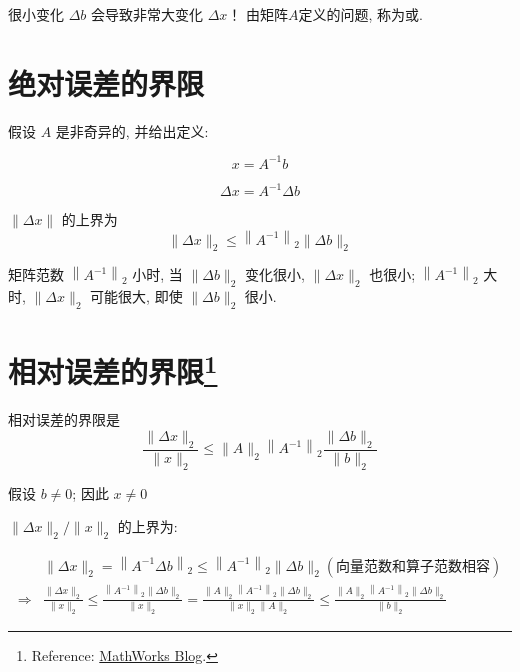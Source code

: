 很小变化 $ \Delta b $ 会导致非常大变化 $ \Delta x $！ 由矩阵$A$定义的问题, 称为或. 



\section{绝对误差的界限}

假设 $ A $ 是非奇异的, 并给出定义:

\begin{notation}
    $$ x=A^{-1} b$$ 
    
    $$ \Delta x=A^{-1} \Delta b $$
\end{notation}

\begin{theorem}[绝对误差的界限]
    $ \|\Delta x\| $ 的上界为
    $$
    \|\Delta x\|_{2} \leq\left\|A^{-1}\right\|_{2}\|\Delta b\|_{2}
    $$

\end{theorem}

矩阵范数 $ \left\|A^{-1}\right\|_{2} $ 小时, 当 $ \|\Delta b\|_{2} $ 变化很小, $ \|\Delta x\|_{2} $ 也很小; $ \left\|A^{-1}\right\|_{2} $ 大时,  $ \|\Delta x\|_{2} $ 可能很大,  即使 $ \|\Delta b\|_{2} $ 很小. 

\section[相对误差的界限]{相对误差的界限\footnote{Reference: \href{https://blogs.mathworks.com/cleve/2017/07/17/what-is-the-condition-number-of-a-matrix/?from=cn}{MathWorks Blog}.}}

\begin{theorem}[相对误差的界限]
    相对误差的界限是
    $$ \frac{\|\Delta x\|_{2}}{\|x\|_{2}} \leq\|A\|_{2}\left\|A^{-1}\right\|_{2} \frac{\|\Delta b\|_{2}}{\|b\|_{2}} $$
\end{theorem}

假设 $ b \neq 0 $; 因此 $ x \neq 0$

$\|\Delta x\|_{2} /\|x\|_{2} $ 的上界为:

$$ 
\begin{aligned}
    &\|\Delta x\|_{2}=\left\|A^{-1} \Delta b\right\|_{2} \leq\left\|A^{-1}\right\|_{2}\|\Delta b\|_{2}(向量范数和算子范数相容)\\
    \Rightarrow& \frac{\|\Delta x\|_{2}}{\|x\|_{2}} \leq \frac{\left\|A^{-1}\right\|_{2}\|\Delta b\|_{2}}{\|x\|_{2}}=\frac{\|A\|_{2}\left\|A^{-1}\right\|_{2}\|\Delta b\|_{2}}{\|x\|_{2}\|A\|_{2}} \leq \frac{\|A\|_{2}\left\|A^{-1}\right\|_{2}\|\Delta b\|_{2}}{\|b\|_{2}}
\end{aligned}
$$

